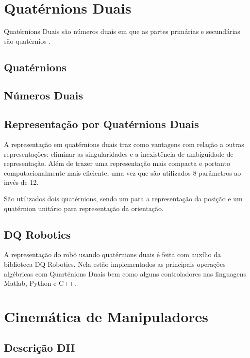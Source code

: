 \section{Quatérnions Duais}

Quatérnions Duais são números duais em que as partes primárias e secundárias são quatérnios \cite{nobody}.

\subsection{Quatérnions}
%
\subsection{Números Duais}

\subsection{Representação por Quatérnions Duais}

A representação em quatérnions duais traz como vantagens com relação a outras representações: eliminar as singularidades e a inexistência de ambiguidade de representação. Além de trazer uma representação mais compacta e portanto computacionalmente mais eficiente, uma vez que são utilizados 8 parâmetros ao invés de 12. %

São utilizados dois quatérnions, sendo um para a representação da posição e um quatérnion unitário para representação da orientação.

\subsection{DQ Robotics}

A representação do robô usando quatérnions duais é feita com auxílio da biblioteca DQ Robotics. Nela estão implementados as principais operações algébricas com Quarténions Duais bem como alguns controladores nas linguagens Matlab, Python e C++.

\section{Cinemática de Manipuladores}

\subsection{Descrição DH}

